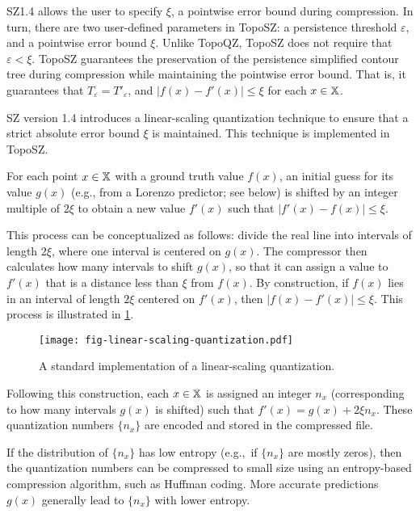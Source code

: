 SZ1.4 allows the user to specify $\xi$, a pointwise error bound during compression. In turn, there are two user-defined parameters in TopoSZ: a persistence threshold $\varepsilon$, and a pointwise error bound $\xi$. Unlike TopoQZ, TopoSZ does not require that $\varepsilon < \xi$. 
TopoSZ guarantees the preservation of the persistence simplified contour tree during compression while maintaining the pointwise error bound. 
That is, it guarantees that $T_\varepsilon = T'_\varepsilon$, and $|f(x)-f'(x)| \leq \xi$ for each $x \in \mathbb{X}$.

SZ version 1.4 introduces a linear-scaling quantization technique to ensure that a strict absolute error bound $\xi$ is maintained. This technique is implemented in TopoSZ.

For each point $x \in \mathbb{X}$ with a ground truth value $f(x)$, an initial guess for its value $g(x)$ (e.g., from a Lorenzo predictor; see below) is shifted by an integer multiple of $2\xi$ to obtain a new value $f'(x)$ such that $|f'(x) - f(x)| \leq \xi$. 

This process can be conceptualized as follows: divide the real line into intervals of length $2\xi$, where one interval is centered on $g(x)$. 
The compressor then calculates how many intervals to shift $g(x)$, so that it can assign a value to $f'(x)$ that is a distance less than $\xi$ from $f(x)$. By construction, if $f(x)$ lies in an interval of length $2\xi$ centered on $f'(x)$, then $|f(x)-f'(x)| \leq \xi$. 
This process is illustrated in \cref{fig:linear-scaling-quantization}.
\begin{figure}[!ht]
  \vspace{-3mm}
  \centering
  \texttt{[image: fig-linear-scaling-quantization.pdf]}
  \vspace{-8mm}
  \caption{A standard implementation of a linear-scaling quantization.}
  \label{fig:linear-scaling-quantization}
  \vspace{-4mm}
\end{figure}
\noindent Following this construction, each $x \in \mathbb{X}$ is assigned an integer $n_x$ (corresponding to how many intervals $g(x)$ is shifted) such that $f'(x) = g(x) + 2\xi n_x$. These quantization numbers $\{n_x\}$ are encoded and stored in the compressed file.

If the distribution of $\{n_x\}$ has low entropy (e.g.,~if $\{n_x\}$ are mostly zeros), then the quantization numbers can be compressed to small size using an entropy-based compression algorithm, such as Huffman coding. 
More accurate predictions $g(x)$ generally lead to $\{n_x\}$ with lower entropy.

